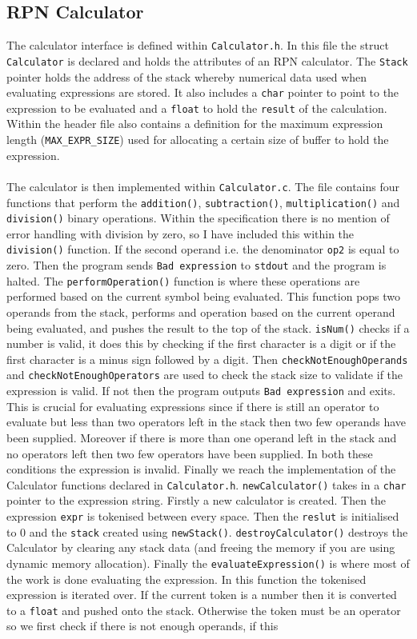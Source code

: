 \documentclass{article}
\begin{document}
\subsection{RPN Calculator}
The calculator interface is defined within \verb+Calculator.h+. In this file the struct \verb+Calculator+ is declared and holds the attributes of an RPN calculator. The \verb+Stack+ pointer holds the address of the stack whereby numerical data used when evaluating expressions are stored. It also includes a \verb+char+ pointer to point to the expression to be evaluated and a \verb+float+ to hold the \verb+result+ of the calculation. Within the header file also contains a definition for the maximum expression length (\verb+MAX_EXPR_SIZE+) used for allocating a certain size of buffer to hold the expression. \\ \\ \noindent The calculator is then implemented within \verb+Calculator.c+. The file contains four functions that perform the \verb+addition()+, \verb+subtraction()+, \verb+multiplication()+ and \verb+division()+ binary operations. Within the specification there is no mention of error handling with division by zero, so I have included this within the \verb+division()+ function. If the second operand i.e. the denominator \verb+op2+ is equal to zero. Then the program sends \verb+Bad expression+ to \verb+stdout+ and the program is halted. The \verb+performOperation()+ function is where these operations are performed based on the current symbol being evaluated. This function pops two operands from the stack, performs and operation based on the current operand being evaluated, and pushes the result to the top of the stack. \verb+isNum()+ checks if a number is valid, it does this by checking if the first character is a digit or if the first character is a minus sign followed by a digit. Then \verb+checkNotEnoughOperands+ and \verb+checkNotEnoughOperators+ are used to check the stack size to validate if the expression is valid. If not then the program outputs \verb+Bad expression+ and exits. This is crucial for evaluating expressions since if there is still an operator to evaluate but less than two operators left in the stack then two few operands have been supplied. Moreover if there is more than one operand left in the stack and no operators left then two few operators have been supplied. In both these conditions the expression is invalid. Finally we reach the implementation of the Calculator functions declared in \verb+Calculator.h+. \verb+newCalculator()+ takes in a \verb+char+ pointer to the expression string. Firstly a new calculator is created. Then the expression \verb+expr+ is tokenised between every space. Then the \verb+reslut+ is initialised to 0 and the \verb+stack+ created using \verb+newStack()+. \verb+destroyCalculator()+ destroys the Calculator by clearing any stack data (and freeing the memory if you are using dynamic memory allocation). Finally the \verb+evaluateExpression()+ is where most of the work is done evaluating the expression. In this function the tokenised expression is iterated over. If the current token is a number then it is converted to a \verb+float+ and pushed onto the stack. Otherwise the token must be an operator so we first check if there is not enough operands, if this 
\end{document}
